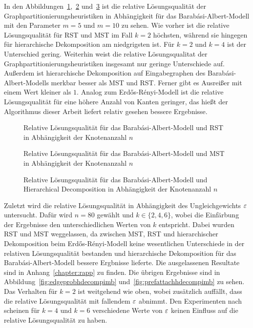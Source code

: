 \vfill\clearpage

In den Abbildungen~\ref{fig:prefattachrstnode},~\ref{fig:prefattachmstnode} und~\ref{fig:prefattachhdecompnode} ist die relative Lösungsqualität der Graphpartitionierungsheuristiken in Abhängigkeit für das Barabási-Albert-Modell mit den Parameter $m=5$ und $m=10$ zu sehen.
Wie vorher ist die relative Lösungsqualität für RST und MST im Fall $k=2$ höchsten, während sie hingegen für hierarchische Dekomposition am niedgrigsten ist.
Für $k=2$ und $k=4$ ist der Unterschied gering.
Weiterhin weist die relative Lösungsqualitat der Graphpartitionierungsheuristiken insgesamt nur geringe Unterschiede auf.
Außerdem ist hierarchische Dekomposition auf Eingabegraphen des Barabási-Albert-Modells merkbar besser als MST und RST.
Ferner gibt es Ausreißer mit einem Wert kleiner als $1$.
Analog zum Erdős-Rényi-Modell ist die relative Lösungsqualität für eine höhere Anzahl von Kanten geringer, das hießt der Algorithmus dieser Arbeit liefert relativ gesehen bessere Ergebnisse.

\begin{figure}[H]
    \centering
    
    \caption{Relative Lösungsqualität für das Barabási-Albert-Modell und RST in Abhängigkeit der Knotenanzahl $n$\label{fig:prefattachrstnode}}
\end{figure}

\begin{figure}[H]
    \centering
    
    \caption{Relative Lösungsqualität für das Barabási-Albert-Modell und MST in Abhängigkeit der Knotenanzahl $n$\label{fig:prefattachmstnode}}
\end{figure}

\begin{figure}[H]
    \centering
    
    \caption{Relative Lösungsqualität für das Barabási-Albert-Modell und Hierarchical Decomposition in Abhängigkeit der Knotenanzahl $n$\label{fig:prefattachhdecompnode}}
\end{figure}

\vfill\clearpage

Zuletzt wird die relative Lösungsqualität in Abhängigkeit des Ungleichgewichts $\varepsilon$ untersucht.
Dafür wird $n=80$ gewählt und $k \in \{2, 4, 6\}$, wobei die Einfärbung der Ergebnisse den unterschiedlichen Werten von $k$ entspricht.
Dabei wurden RST und MST weggelassen, da zwischen MST, RST und hierarchischer Dekomposition beim Erdős-Rényi-Modell keine wesentlichen Unterschiede in der relativen Lösungsqualität bestanden und hierarchische Dekomposition für das Barabási-Albert-Modell bessere Ergbnisse lieferte.
Die ausgelassenen Resultate sind in Anhang~\ref{chapter:rapp} zu finden.
Die übrigen Ergebnisse sind in Abbildung~\ref{fig:edgeprobhdecompimb} und~\ref{fig:prefattachhdecompimb} zu sehen.
Das Verhalten für $k=2$ ist weitgehend wie oben, wobei zusätzlich auffällt, dass die relative Lösungsqualität mit fallendem $\varepsilon$ abnimmt.
Den Experimenten nach scheinen für $k=4$ und $k=6$ verschiedene Werte von $\varepsilon$ keinen Einfluss auf die relative Lösungsqualität zu haben.

